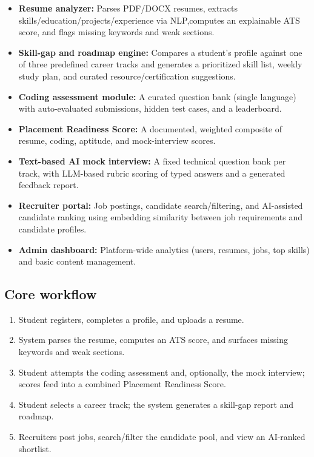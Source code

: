 \documentclass[11pt,a4paper]{article}
\begin{document}
\begin{itemize}[leftmargin=0.7cm]
    \item \textbf{Resume analyzer:} Parses PDF/DOCX resumes, extracts skills/education/projects/experience via NLP,computes an explainable ATS score, and flags missing keywords and weak sections.
    \item \textbf{Skill-gap and roadmap engine:} Compares a student's profile against one of three predefined career tracks and generates a prioritized skill list, weekly study plan, and curated resource/certification suggestions.
    \item \textbf{Coding assessment module:} A curated question bank (single language) with auto-evaluated submissions, hidden test cases, and a leaderboard.
    \item \textbf{Placement Readiness Score:} A documented, weighted composite of resume, coding, aptitude, and mock-interview scores.
    \item \textbf{Text-based AI mock interview:} A fixed technical question bank per track, with LLM-based rubric scoring of typed answers and a generated feedback report.
    \item \textbf{Recruiter portal:} Job postings, candidate search/filtering, and AI-assisted candidate ranking using embedding similarity between job requirements and candidate profiles.
    \item \textbf{Admin dashboard:} Platform-wide analytics (users, resumes, jobs, top skills) and basic content management.
\end{itemize}

\subsection{Core workflow}
\begin{enumerate}[leftmargin=0.7cm]
    \item Student registers, completes a profile, and uploads a resume.
    \item System parses the resume, computes an ATS score, and surfaces missing keywords and weak sections.
    \item Student attempts the coding assessment and, optionally, the mock interview; scores feed into a combined Placement Readiness Score.
    \item Student selects a career track; the system generates a skill-gap report and roadmap.
    \item Recruiters post jobs, search/filter the candidate pool, and view an AI-ranked shortlist.

\end{enumerate}
\end{document}
